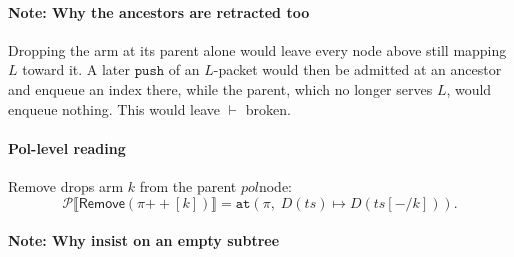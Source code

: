 \documentclass[sigplan,anonymous,review,nonacm]{acmart}
\newcommand{\push}{\ensuremath{\mathtt{push}}}
\newcommand{\psem}[1]{\mathcal{P}\llbracket #1 \rrbracket}
\newcommand{\notation}[1]{\ensuremath{#1}\ifmmode\else\xspace\fi}
\newcommand{\pol}{\notation{\mathit{pol}}}
\newcommand{\Remove}{\textsf{Remove}}
\begin{document}
\paragraph{Note: Why the ancestors are retracted too}

Dropping the arm at its parent alone would leave every node above still mapping \(L\) toward it.
A later \push{} of an \(L\)-packet would then be admitted at an ancestor and enqueue an index there, while the parent, which no longer serves \(L\), would enqueue nothing.
This would leave \(\vdash\) broken.

\paragraph{Pol-level reading}

\Remove{} drops arm \(k\) from the parent \pol node:
\[
\psem{\Remove(\pi \mathbin{+\!\!+} [k])} = \mathtt{at}(\pi,\; D(\mathit{ts}) \mapsto D(\mathit{ts}[-/k])).
\]

\paragraph{Note: Why insist on an empty subtree}
\end{document}
